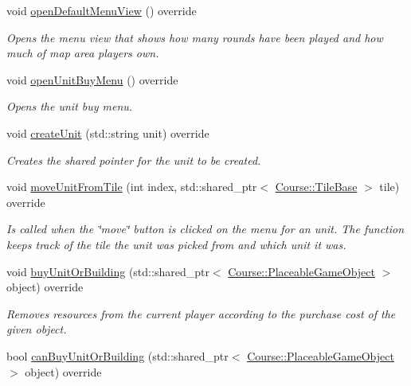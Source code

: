 \begin{DoxyCompactItemize}
void \hyperlink{class_student_1_1_game_event_handler_a5beff8c3746359f5f85243adff4439bb}{open\-Default\-Menu\-View} () override
\begin{DoxyCompactList}\small\item\em Opens the menu view that shows how many rounds have been played and how much of map area players own. \end{DoxyCompactList}\item 
void \hyperlink{class_student_1_1_game_event_handler_a0712fc2cdf6154039d28edf064b2e9de}{open\-Unit\-Buy\-Menu} () override
\begin{DoxyCompactList}\small\item\em Opens the unit buy menu. \end{DoxyCompactList}\item 
void \hyperlink{class_student_1_1_game_event_handler_a26a4c686b6becf36b31434d7381ef7a5}{create\-Unit} (std\-::string unit) override
\begin{DoxyCompactList}\small\item\em Creates the shared pointer for the unit to be created. \end{DoxyCompactList}\item 
void \hyperlink{class_student_1_1_game_event_handler_aa264f9e825b26c57dc748101fe7e0174}{move\-Unit\-From\-Tile} (int index, std\-::shared\-\_\-ptr$<$ \hyperlink{class_course_1_1_tile_base}{Course\-::\-Tile\-Base} $>$ tile) override
\begin{DoxyCompactList}\small\item\em Is called when the \char`\"{}move\char`\"{} button is clicked on the menu for an unit. The function keeps track of the tile the unit was picked from and which unit it was. \end{DoxyCompactList}\item 
void \hyperlink{class_student_1_1_game_event_handler_ae27fbedf86bbe64a384ee0844c09c790}{buy\-Unit\-Or\-Building} (std\-::shared\-\_\-ptr$<$ \hyperlink{class_course_1_1_placeable_game_object}{Course\-::\-Placeable\-Game\-Object} $>$ object) override
\begin{DoxyCompactList}\small\item\em Removes resources from the current player according to the purchase cost of the given object. \end{DoxyCompactList}\item 
bool \hyperlink{class_student_1_1_game_event_handler_ae1142bf1c664551b6443d8ffed4c7b7e}{can\-Buy\-Unit\-Or\-Building} (std\-::shared\-\_\-ptr$<$ \hyperlink{class_course_1_1_placeable_game_object}{Course\-::\-Placeable\-Game\-Object} $>$ object) override

\end{DoxyCompactItemize}
